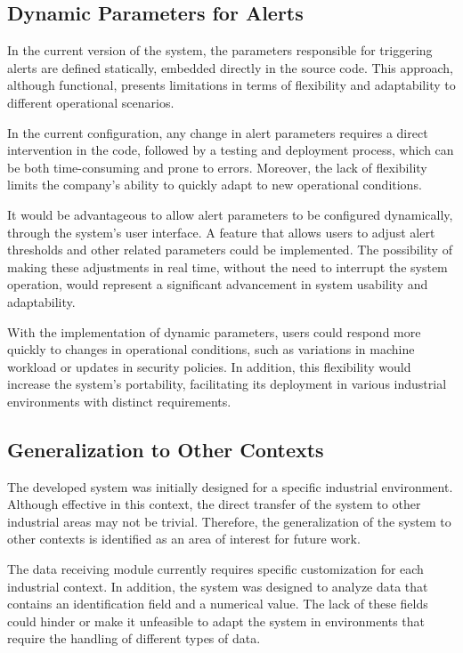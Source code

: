 \subsection{Dynamic Parameters for Alerts}

In the current version of the system, the parameters responsible for triggering alerts are defined statically, embedded directly in the source code. This approach, although functional, presents limitations in terms of flexibility and adaptability to different operational scenarios.

In the current configuration, any change in alert parameters requires a direct intervention in the code, followed by a testing and deployment process, which can be both time-consuming and prone to errors. Moreover, the lack of flexibility limits the company's ability to quickly adapt to new operational conditions.

It would be advantageous to allow alert parameters to be configured dynamically, through the system's user interface. A feature that allows users to adjust alert thresholds and other related parameters could be implemented. The possibility of making these adjustments in real time, without the need to interrupt the system operation, would represent a significant advancement in system usability and adaptability.

With the implementation of dynamic parameters, users could respond more quickly to changes in operational conditions, such as variations in machine workload or updates in security policies. In addition, this flexibility would increase the system's portability, facilitating its deployment in various industrial environments with distinct requirements.

\subsection{Generalization to Other Contexts}

The developed system was initially designed for a specific industrial environment. Although effective in this context, the direct transfer of the system to other industrial areas may not be trivial. Therefore, the generalization of the system to other contexts is identified as an area of interest for future work.

The data receiving module currently requires specific customization for each industrial context. In addition, the system was designed to analyze data that contains an identification field and a numerical value. The lack of these fields could hinder or make it unfeasible to adapt the system in environments that require the handling of different types of data.

